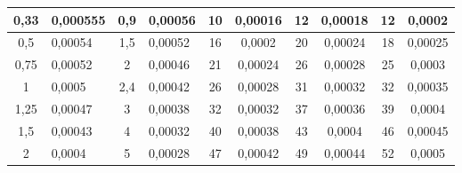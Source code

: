 \documentclass[12pt,a4paper]{article}
\begin{document}
\begin{enumerate}
\begin{table}[!h]
{\begin{tabular}{|c|l|cl|c|c|c|c|cc}
				{\color[HTML]{000000} 0,33} & {\color[HTML]{000000} 0,000555} & \multicolumn{1}{c|}{{\color[HTML]{000000} 0,9}} & {\color[HTML]{000000} 0,00056} & {\color[HTML]{000000} 10} & {\color[HTML]{000000} 0,00016} & {\color[HTML]{000000} 12} & {\color[HTML]{000000} 0,00018} & \multicolumn{1}{c|}{{\color[HTML]{000000} 12}} & \multicolumn{1}{c|}{{\color[HTML]{000000} 0,0002}} \\ \hline
				{\color[HTML]{000000} 0,5} & {\color[HTML]{000000} 0,00054} & \multicolumn{1}{c|}{{\color[HTML]{000000} 1,5}} & {\color[HTML]{000000} 0,00052} & {\color[HTML]{000000} 16} & {\color[HTML]{000000} 0,0002} & {\color[HTML]{000000} 20} & {\color[HTML]{000000} 0,00024} & \multicolumn{1}{c|}{{\color[HTML]{000000} 18}} & \multicolumn{1}{c|}{{\color[HTML]{000000} 0,00025}} \\ \hline
				{\color[HTML]{000000} 0,75} & {\color[HTML]{000000} 0,00052} & \multicolumn{1}{c|}{{\color[HTML]{000000} 2}} & {\color[HTML]{000000} 0,00046} & {\color[HTML]{000000} 21} & {\color[HTML]{000000} 0,00024} & {\color[HTML]{000000} 26} & {\color[HTML]{000000} 0,00028} & \multicolumn{1}{c|}{{\color[HTML]{000000} 25}} & \multicolumn{1}{c|}{{\color[HTML]{000000} 0,0003}} \\ \hline
				{\color[HTML]{000000} 1} & {\color[HTML]{000000} 0,0005} & \multicolumn{1}{c|}{{\color[HTML]{000000} 2,4}} & {\color[HTML]{000000} 0,00042} & {\color[HTML]{000000} 26} & {\color[HTML]{000000} 0,00028} & {\color[HTML]{000000} 31} & {\color[HTML]{000000} 0,00032} & \multicolumn{1}{c|}{{\color[HTML]{000000} 32}} & \multicolumn{1}{c|}{{\color[HTML]{000000} 0,00035}} \\ \hline
				{\color[HTML]{000000} 1,25} & {\color[HTML]{000000} 0,00047} & \multicolumn{1}{c|}{{\color[HTML]{000000} 3}} & {\color[HTML]{000000} 0,00038} & {\color[HTML]{000000} 32} & {\color[HTML]{000000} 0,00032} & {\color[HTML]{000000} 37} & {\color[HTML]{000000} 0,00036} & \multicolumn{1}{c|}{{\color[HTML]{000000} 39}} & \multicolumn{1}{c|}{{\color[HTML]{000000} 0,0004}} \\ \hline
				{\color[HTML]{000000} 1,5} & {\color[HTML]{000000} 0,00043} & \multicolumn{1}{c|}{{\color[HTML]{000000} 4}} & {\color[HTML]{000000} 0,00032} & {\color[HTML]{000000} 40} & {\color[HTML]{000000} 0,00038} & {\color[HTML]{000000} 43} & {\color[HTML]{000000} 0,0004} & \multicolumn{1}{c|}{{\color[HTML]{000000} 46}} & \multicolumn{1}{c|}{{\color[HTML]{000000} 0,00045}} \\ \hline
				{\color[HTML]{000000} 2} & {\color[HTML]{000000} 0,0004} & \multicolumn{1}{c|}{{\color[HTML]{000000} 5}} & {\color[HTML]{000000} 0,00028} & {\color[HTML]{000000} 47} & {\color[HTML]{000000} 0,00042} & {\color[HTML]{000000} 49} & {\color[HTML]{000000} 0,00044} & \multicolumn{1}{c|}{{\color[HTML]{000000} 52}} & \multicolumn{1}{c|}{{\color[HTML]{000000} 0,0005}} \\ \hline

\end{tabular}}
\end{table}
\end{enumerate}
\end{document}
